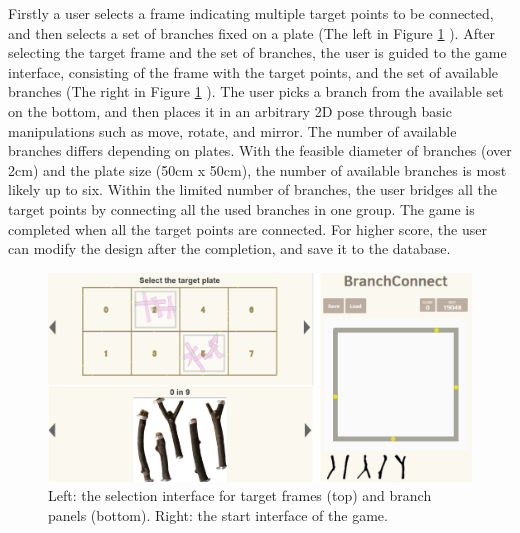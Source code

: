 
Firstly a user selects a frame indicating multiple target points to be connected, and then selects a set of branches fixed on a plate (The left in Figure \ref{fig:game_interface} ).
After selecting the target frame and the set of branches, the user is guided to the game interface, consisting of the frame with the target points, and the set of available branches (The right in Figure \ref{fig:game_interface} ).
The user picks a branch from the available set on the bottom, and then places it in an arbitrary 2D pose through basic manipulations such as move, rotate, and mirror.
The number of available branches differs depending on plates.
With the feasible diameter of branches (over 2cm) and the plate size (50cm x 50cm), the number of available branches is most likely up to six.
Within the limited number of branches, the user bridges all the target points by connecting all the used branches in one group.
The game is completed when all the target points are connected.
For higher score, the user can modify the design after the completion, and save it to the database.

\begin{figure}[H]
  \begin{center}
    \includegraphics[width = 0.4\paperwidth]{images/interface/game_interface.png}
    \caption{Left: the selection interface for target frames (top) and branch panels (bottom). Right: the start interface of the game.}
    \label{fig:game_interface}
  \end{center}
\end{figure}
%
